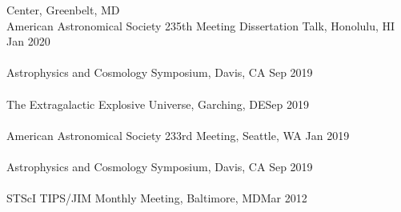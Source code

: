 \documentclass[10pt]{cv}
\begin{document}
\begin{llist}
Center, Greenbelt, MD \\ \vspace{-0.1in}  %
\newpage
\vspace{-0.1in}  
American Astronomical Society 235th Meeting Dissertation Talk, Honolulu, HI \hfill Jan 2020\\ \vspace{-0.1in} 
\\
Astrophysics and Cosmology Symposium, Davis, CA \hfill Sep 2019\\\vspace{-0.1in}  
\\
The Extragalactic Explosive Universe, Garching, DE\hfill Sep 2019\\ \vspace{-0.1in} 
\\
American Astronomical Society 233rd Meeting,  Seattle, WA \hfill Jan 2019\\\vspace{-0.1in}  
\\
Astrophysics and Cosmology Symposium, Davis, CA \hfill Sep 2019\\\vspace{-0.1in}  
\\
STScI TIPS/JIM Monthly Meeting, Baltimore, MD\hfill Mar 2012\\\vspace{-0.1in}  


\end{llist}
\end{document}
